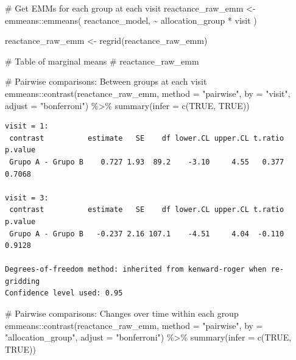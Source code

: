 \documentclass[
  12pt,
]{article}
\newenvironment{Shaded}{\begin{snugshade}}{\end{snugshade}}
\newcommand{\AttributeTok}[1]{\textcolor[rgb]{0.40,0.45,0.13}{#1}}
\newcommand{\CommentTok}[1]{\textcolor[rgb]{0.37,0.37,0.37}{#1}}
\newcommand{\ConstantTok}[1]{\textcolor[rgb]{0.56,0.35,0.01}{#1}}
\newcommand{\FunctionTok}[1]{\textcolor[rgb]{0.28,0.35,0.67}{#1}}
\newcommand{\NormalTok}[1]{\textcolor[rgb]{0.00,0.23,0.31}{#1}}
\newcommand{\OtherTok}[1]{\textcolor[rgb]{0.00,0.23,0.31}{#1}}
\newcommand{\SpecialCharTok}[1]{\textcolor[rgb]{0.37,0.37,0.37}{#1}}
\newcommand{\StringTok}[1]{\textcolor[rgb]{0.13,0.47,0.30}{#1}}
\begin{document}
\begin{Shaded}
\begin{Highlighting}[]
\CommentTok{\# Get EMMs for each group at each visit}
\NormalTok{reactance\_raw\_emm }\OtherTok{\textless{}{-}}\NormalTok{ emmeans}\SpecialCharTok{::}\FunctionTok{emmeans}\NormalTok{(}
\NormalTok{    reactance\_model, }
    \SpecialCharTok{\textasciitilde{}}\NormalTok{ allocation\_group }\SpecialCharTok{*}\NormalTok{ visit}
\NormalTok{)}

\NormalTok{reactance\_raw\_emm }\OtherTok{\textless{}{-}} \FunctionTok{regrid}\NormalTok{(reactance\_raw\_emm)}

\CommentTok{\# Table of marginal means}
\CommentTok{\# reactance\_raw\_emm}

\CommentTok{\# Pairwise comparisons: Between groups at each visit}
\NormalTok{emmeans}\SpecialCharTok{::}\FunctionTok{contrast}\NormalTok{(reactance\_raw\_emm,}
\AttributeTok{method =} \StringTok{"pairwise"}\NormalTok{, }\AttributeTok{by =} \StringTok{"visit"}\NormalTok{,}
\AttributeTok{adjust =} \StringTok{"bonferroni"}\NormalTok{) }\SpecialCharTok{\%\textgreater{}\%} \FunctionTok{summary}\NormalTok{(}\AttributeTok{infer =} \FunctionTok{c}\NormalTok{(}\ConstantTok{TRUE}\NormalTok{, }\ConstantTok{TRUE}\NormalTok{))}
\end{Highlighting}
\end{Shaded}

\begin{verbatim}
visit = 1:
 contrast          estimate   SE    df lower.CL upper.CL t.ratio p.value
 Grupo A - Grupo B    0.727 1.93  89.2    -3.10     4.55   0.377  0.7068

visit = 3:
 contrast          estimate   SE    df lower.CL upper.CL t.ratio p.value
 Grupo A - Grupo B   -0.237 2.16 107.1    -4.51     4.04  -0.110  0.9128

Degrees-of-freedom method: inherited from kenward-roger when re-gridding 
Confidence level used: 0.95 
\end{verbatim}

\begin{Shaded}
\begin{Highlighting}[]
\CommentTok{\# Pairwise comparisons: Changes over time within each group}
\NormalTok{emmeans}\SpecialCharTok{::}\FunctionTok{contrast}\NormalTok{(reactance\_raw\_emm,}
\AttributeTok{method =} \StringTok{"pairwise"}\NormalTok{, }\AttributeTok{by =} \StringTok{"allocation\_group"}\NormalTok{,}
\AttributeTok{adjust =} \StringTok{"bonferroni"}\NormalTok{) }\SpecialCharTok{\%\textgreater{}\%} \FunctionTok{summary}\NormalTok{(}\AttributeTok{infer =} \FunctionTok{c}\NormalTok{(}\ConstantTok{TRUE}\NormalTok{, }\ConstantTok{TRUE}\NormalTok{))}
\end{Highlighting}
\end{Shaded}
\end{document}
